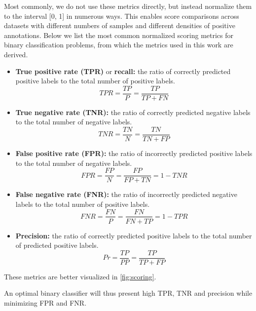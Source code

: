 Most commonly, we do not use these metrics directly, but instead normalize them to the interval [0, 1] in numerous ways. This enables score comparisons across datasets with different numbers of samples and different densities of positive annotations. Below we list the most common normalized scoring metrics for binary classification problems, from which the metrics used in this work are derived.
%
\begin{itemize}
    \item \textbf{True positive rate (TPR)} or \textbf{recall:} the ratio of correctly predicted positive labels to the total number of positive labels.
    \begin{equation}
        TPR = \frac{TP}{P} = \frac{TP}{TP + FN}
        \label{eq:tpr}
    \end{equation}
    \item \textbf{True negative rate (TNR):} the ratio of correctly predicted negative labels to the total number of negative labels.
    \begin{equation}
        TNR = \frac{TN}{N} = \frac{TN}{TN + FP}
        \label{eq:tnr}
    \end{equation}
    \item \textbf{False positive rate (FPR):} the ratio of incorrectly predicted positive labels to the total number of negative labels.
    \begin{equation}
        FPR = \frac{FP}{N} = \frac{FP}{FP + TN} = 1-TNR 
        \label{eq:fpr}
    \end{equation}
    \item \textbf{False negative rate (FNR):} the ratio of incorrectly predicted negative labels to the total number of positive labels.
    \begin{equation}
        FNR = \frac{FN}{P} = \frac{FN}{FN + TP} = 1-TPR
        \label{eq:fnr}
    \end{equation}
    \item \textbf{Precision:} the ratio of correctly predicted positive labels to the total number of predicted positive labels.
    \begin{equation}
        Pr = \frac{TP}{PP} = \frac{TP}{TP + FP}
    \end{equation}
\end{itemize}
%
These metrics are better visualized in \autoref{fig:scoring}.

An optimal binary classifier will thus present high TPR, TNR and precision while minimizing FPR and FNR.

